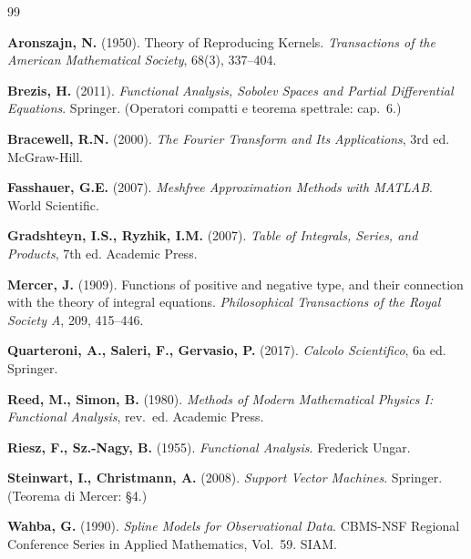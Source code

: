 \documentclass[11pt,a4paper]{article}
\theoremstyle{plain}
\theoremstyle{remark}
\begin{document}
\begin{thebibliography}{99}

\textbf{Aronszajn, N.} (1950). Theory of Reproducing Kernels.
\textit{Transactions of the American Mathematical Society}, 68(3), 337--404.

\textbf{Brezis, H.} (2011). \textit{Functional Analysis, Sobolev Spaces and Partial Differential
Equations}. Springer. (Operatori compatti e teorema spettrale: cap.~6.)

\textbf{Bracewell, R.N.} (2000). \textit{The Fourier Transform and Its Applications}, 3rd ed.
McGraw-Hill.

\textbf{Fasshauer, G.E.} (2007). \textit{Meshfree Approximation Methods with MATLAB}. World
Scientific.

\textbf{Gradshteyn, I.S., Ryzhik, I.M.} (2007). \textit{Table of Integrals, Series, and Products},
7th ed. Academic Press.

\textbf{Mercer, J.} (1909). Functions of positive and negative type, and their connection with the
theory of integral equations. \textit{Philosophical Transactions of the Royal Society A}, 209,
415--446.

\textbf{Quarteroni, A., Saleri, F., Gervasio, P.} (2017). \textit{Calcolo Scientifico}, 6a ed.
Springer.

\textbf{Reed, M., Simon, B.} (1980). \textit{Methods of Modern Mathematical Physics I: Functional
Analysis}, rev.\ ed. Academic Press.

\textbf{Riesz, F., Sz.-Nagy, B.} (1955). \textit{Functional Analysis}. Frederick Ungar.

\textbf{Steinwart, I., Christmann, A.} (2008). \textit{Support Vector Machines}. Springer.
(Teorema di Mercer: \S4.)

\textbf{Wahba, G.} (1990). \textit{Spline Models for Observational Data}. CBMS-NSF Regional
Conference Series in Applied Mathematics, Vol.~59. SIAM.

\end{thebibliography}
\end{document}
